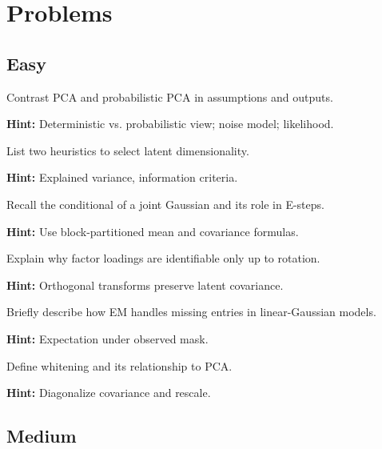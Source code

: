 
\section*{Problems}

\subsection*{Easy}

\begin{problem}
Contrast PCA and probabilistic PCA in assumptions and outputs.

\textbf{Hint:} Deterministic vs. probabilistic view; noise model; likelihood.
\end{problem}

\begin{problem}
List two heuristics to select latent dimensionality.

\textbf{Hint:} Explained variance, information criteria.
\end{problem}

\begin{problem}
Recall the conditional of a joint Gaussian and its role in E-steps.

\textbf{Hint:} Use block-partitioned mean and covariance formulas.
\end{problem}

\begin{problem}
Explain why factor loadings are identifiable only up to rotation.

\textbf{Hint:} Orthogonal transforms preserve latent covariance.
\end{problem}

\begin{problem}
Briefly describe how EM handles missing entries in linear-Gaussian models.

\textbf{Hint:} Expectation under observed mask.
\end{problem}

\begin{problem}[Whitening]
Define whitening and its relationship to PCA.

\textbf{Hint:} Diagonalize covariance and rescale.
\end{problem}

\subsection*{Medium}

